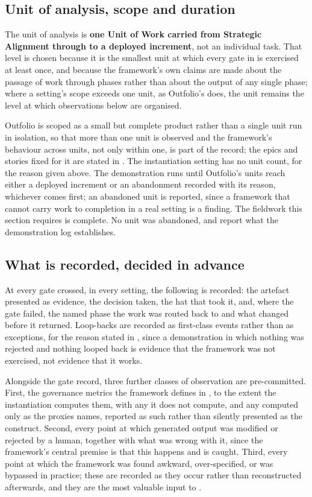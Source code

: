 \subsection*{Unit of analysis, scope and duration}

The unit of analysis is \textbf{one Unit of Work carried from Strategic Alignment through to a deployed increment}, not an individual task. That level is chosen because it is the smallest unit at which every gate in  is exercised at least once, and because the framework's own claims are made about the passage of work through phases rather than about the output of any single phase; where a setting's scope exceeds one unit, as Outfolio's does, the unit remains the level at which observations below are organised.

Outfolio is scoped as a small but complete product rather than a single unit run in isolation, so that more than one unit is observed and the framework's behaviour across units, not only within one, is part of the record; the epics and stories fixed for it are stated in . The instantiation setting has no unit count, for the reason given above. The demonstration runs until Outfolio's units reach either a deployed increment or an abandonment recorded with its reason, whichever comes first; an abandoned unit is reported, since a framework that cannot carry work to completion in a real setting is a finding. The fieldwork this section requires is complete. No unit was abandoned, and  report what the demonstration log establishes.

\subsection*{What is recorded, decided in advance}

At every gate crossed, in every setting, the following is recorded: the artefact presented as evidence, the decision taken, the hat that took it, and, where the gate failed, the named phase the work was routed back to and what changed before it returned. Loop-backs are recorded as first-class events rather than as exceptions, for the reason stated in , since a demonstration in which nothing was rejected and nothing looped back is evidence that the framework was not exercised, not evidence that it works.

Alongside the gate record, three further classes of observation are pre-committed. First, the governance metrics the framework defines in , to the extent the instantiation computes them, with any it does not compute, and any computed only as the proxies  names, reported as such rather than silently presented as the construct. Second, every point at which generated output was modified or rejected by a human, together with what was wrong with it, since the framework's central premise is that this happens and is caught. Third, every point at which the framework was found awkward, over-specified, or was bypassed in practice; these are recorded as they occur rather than reconstructed afterwards, and they are the most valuable input to .

